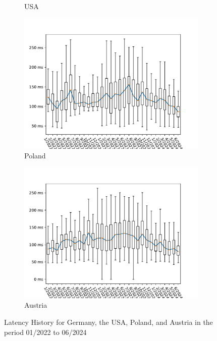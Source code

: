 \begin{figure}
\begin{subfigure}[b]{0.47\linewidth}
		\caption{USA}
	\end{subfigure}
	\begin{subfigure}[b]{0.47\linewidth}
		\includegraphics[width=\linewidth]{chapters/4-results/latency/img/latency_2022_to_2024_Poland.pdf}
		\caption{Poland}
	\end{subfigure}
	\begin{subfigure}[b]{0.47\linewidth}
		\includegraphics[width=\linewidth]{chapters/4-results/latency/img/latency_2022_to_2024_Austria.pdf}
		\caption{Austria}
	\end{subfigure}
	\caption{Latency History for Germany, the USA, Poland, and Austria in the period 01/2022 to 06/2024}
	\label{fig:latency_wholerange}
\end{figure}

